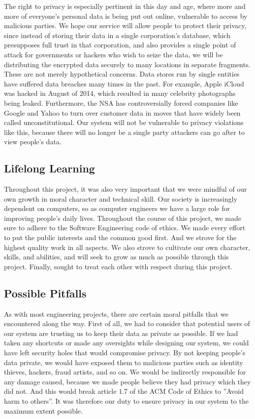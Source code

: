 	The right to privacy is especially pertinent in this day and age, where more and more of everyone’s personal data is being put out online, vulnerable to access by malicious parties.  We hope our service will allow people to protect their privacy, since instead of storing their data in a single corporation’s database, which presupposes full trust in that corporation, and also provides a single point of attack for governments or hackers who wish to seize the data, we will be distributing the encrypted data securely to many locations in separate fragments.  These are not merely hypothetical concerns.  Data stores run by single entities have suffered data breaches many times in the past.  For example, Apple iCloud was hacked in August of 2014, which resulted in many celebrity photographs being leaked. \cite{independent}  Furthermore, the NSA has controversially forced companies like Google and Yahoo to turn over customer data in moves that have widely been called unconstitutional. \cite{gizmodo}  Our system will not be vulnerable to privacy violations like this, because there will no longer be a single party attackers can go after to view people's data.

\subsection{Lifelong Learning}

	Throughout this project, it was also very important that we were mindful of our own growth in moral character and technical skill.  Our society is increasingly dependent on computers, so as computer engineers we have a large role for improving people’s daily lives.  Throughout the course of this project, we made sure to adhere to the Software Engineering code of ethics.  We made every effort to put the public interests and the common good first.  And we strove for the highest quality work in all aspects.  We also strove to cultivate our own character, skills, and abilities, and will seek to grow as much as possible through this project.  Finally, sought to treat each other with respect during this project.

\subsection{Possible Pitfalls}
	As with most engineering projects, there are certain moral pitfalls that we encountered along the way.  First of all, we had to consider that potential users of our system are trusting us to keep their data as private as possible.  If we had taken any shortcuts or made any oversights while designing our system, we could have left security holes that would compromise privacy.  By not keeping people's data private, we would have exposed them to malicious parties such as identity thieves, hackers, fraud artists, and so on.  We would be indirectly responsible for any damage caused, because we made people believe they had privacy which they did not.  And this would break article 1.7 of the ACM Code of Ethics to ''Avoid harm to others''. \cite{acmethics}  It was therefore our duty to ensure privacy in our system to the maximum extent possible.

